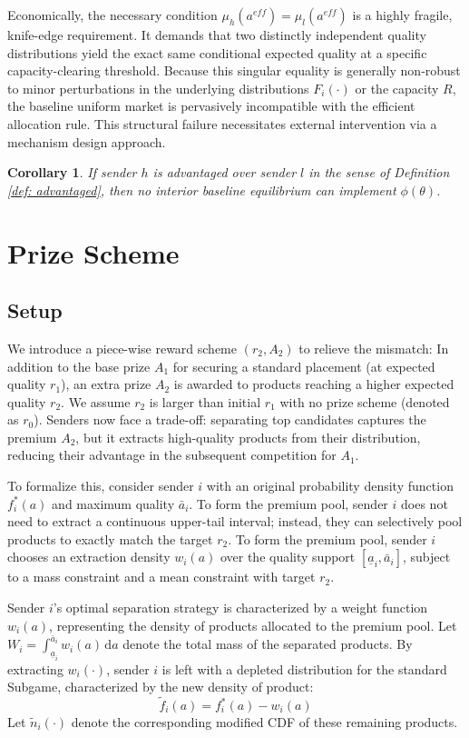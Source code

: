 \documentclass[12pt, a4paper]{article}
\newtheorem{corollary}{Corollary}
\begin{document}
Economically, the necessary condition $\mu_h(a^{eff}) = \mu_l(a^{eff})$ is a highly fragile, knife-edge requirement. It demands that two distinctly independent quality distributions yield the exact same conditional expected quality at a specific capacity-clearing threshold. Because this singular equality is generally non-robust to minor perturbations in the underlying distributions $F_i(\cdot)$ or the capacity $R$, the baseline uniform market is pervasively incompatible with the efficient allocation rule. This structural failure necessitates external intervention via a mechanism design approach.

\begin{corollary}
If sender $h$ is advantaged over sender $l$ in the sense of Definition \ref{def: advantaged}, then no interior baseline equilibrium can implement $\phi (\theta)$.
\end{corollary}

\section{Prize Scheme}

\subsection{Setup}
We introduce a piece-wise reward scheme $(r_2, A_2)$ to relieve the mismatch: In addition to the base prize $A_1$ for securing a standard placement (at expected quality $r_1$), an extra prize $A_2$ is awarded to products reaching a higher expected quality $r_2$. We assume $r_2$ is larger than initial $r_1$ with no prize scheme (denoted as $r_0$). Senders now face a trade-off: separating top candidates captures the premium $A_2$, but it extracts high-quality products from their distribution, reducing their advantage in the subsequent competition for $A_1$.

To formalize this, consider sender $i$ with an original probability density function $f_i^*(a)$ and maximum quality $\bar{a}_i$. To form the premium pool, sender $i$ does not need to extract a continuous upper-tail interval; instead, they can selectively pool products to exactly match the target $r_2$. To form the premium pool, sender $i$ chooses an extraction density $w_i(a)$ over the quality support $[\underline{a}_i,\bar{a}_i]$, subject to a mass constraint and a mean constraint with target $r_2$. 


Sender $i$'s optimal separation strategy is characterized by a weight function $w_i(a)$, representing the density of products allocated to the premium pool. Let $W_i = \int_{\underline{a}_i}^{\bar{a}_i} w_i(a) \, \mathrm{d}a$ denote the total mass of the separated products. By extracting $w_i(\cdot)$, sender $i$ is left with a depleted distribution for the standard Subgame, characterized by the new density of product:
$$ \tilde{f}_i(a) =f_i^*(a) - w_i(a) $$
Let $\tilde{n}_i(\cdot)$ denote the corresponding modified CDF of these remaining products. 
\end{document}
